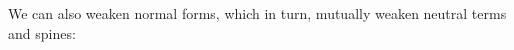 We can also weaken normal forms, which in turn, mutually weaken neutral terms and spines:

\begin{code}[hide]%
\>[0]\<%
\end{code}

\begin{code}%
\>[0][@{}l@{\AgdaIndent{1}}]%
\>[2]\AgdaSpace{}%
\AgdaSymbol{:}\AgdaSpace{}%
\AgdaSymbol{(}\AgdaSpace{}%
\AgdaSymbol{:}\AgdaSpace{}%
\AgdaSpace{}%
\AgdaSpace{}%
\AgdaSymbol{)}\AgdaSpace{}%
\AgdaSpace{}%
\AgdaSpace{}%
\AgdaSymbol{(}\AgdaSpace{}%
\AgdaOperator{\AgdaFunction{-}}\AgdaSpace{}%
\AgdaSymbol{)}\AgdaSpace{}%
\AgdaSpace{}%
\AgdaSpace{}%
\AgdaSpace{}%
\AgdaSpace{}%
\<%
\\
%
\>[2]\AgdaSpace{}%
\AgdaSpace{}%
\AgdaSymbol{(}\AgdaSpace{}%
\AgdaSymbol{)}\AgdaSpace{}%
\AgdaSymbol{=}\AgdaSpace{}%
\AgdaSpace{}%
\AgdaSymbol{(}\AgdaSpace{}%
\AgdaSymbol{(}\AgdaSpace{}%
\AgdaSymbol{)}\AgdaSpace{}%
\AgdaSymbol{)}\<%
\\
%
\>[2]\AgdaSpace{}%
\AgdaSpace{}%
\AgdaSymbol{(}\AgdaSpace{}%
\AgdaSymbol{)}\AgdaSpace{}%
\AgdaSymbol{=}\AgdaSpace{}%
\AgdaSpace{}%
\AgdaSymbol{(}\AgdaSpace{}%
\AgdaSpace{}%
\AgdaSymbol{)}\<%
\\
%
\\[\AgdaEmptyExtraSkip]%
%
\>[2]\AgdaSpace{}%
\AgdaSymbol{:}\AgdaSpace{}%
\AgdaSymbol{(}\AgdaSpace{}%
\AgdaSymbol{:}\AgdaSpace{}%
\AgdaSpace{}%
\AgdaSpace{}%
\AgdaSymbol{)}\AgdaSpace{}%
\AgdaSpace{}%
\AgdaSpace{}%
\AgdaSymbol{(}\AgdaSpace{}%
\AgdaOperator{\AgdaFunction{-}}\AgdaSpace{}%
\AgdaSymbol{)}\AgdaSpace{}%
\AgdaSpace{}%
\AgdaSpace{}%
\AgdaSpace{}%
\AgdaSpace{}%
\<%
\\
%
\>[2]\AgdaSpace{}%

\end{code}
